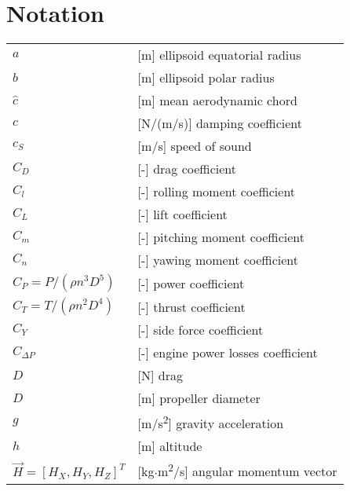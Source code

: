 \clearpage %
{}
\chapter*{Notation}
\markright{}

\begin{longtable}[l]{ l p{} }
  $a$                                          & [m] ellipsoid equatorial radius \\
  $b$                                          & [m] ellipsoid polar radius \\
  $\hat c$                                     & [m] mean aerodynamic chord \\
  $c$                                          & [N/(m/s)] damping coefficient \\
  $c_S$                                        & [m/s] speed of sound \\
  $C_D$                                        & [-] drag coefficient \\
  $C_l$                                        & [-] rolling moment coefficient \\
  $C_L$                                        & [-] lift coefficient \\
  $C_m$                                        & [-] pitching moment coefficient \\
  $C_n$                                        & [-] yawing moment coefficient \\
  $C_P=P / \left( \rho n^3 D^5 \right)$        & [-] power coefficient \\
  $C_T=T / \left( \rho n^2 D^4 \right)$        & [-] thrust coefficient \\
  $C_Y$                                        & [-] side force coefficient \\
  $C_{\Delta P}$                               & [-] engine power losses coefficient \\
  $D$                                          & [N] drag \\
  $D$                                          & [m] propeller diameter \\
  $g$                                          & [m/s\textsuperscript{2}] gravity acceleration \\
  $h$                                          & [m] altitude \\
  $\vec H=\left[ H_X, H_Y, H_Z \right]^T$      & [kg$\cdot$m\textsuperscript{2}/s] angular momentum vector \\

\end{longtable}
